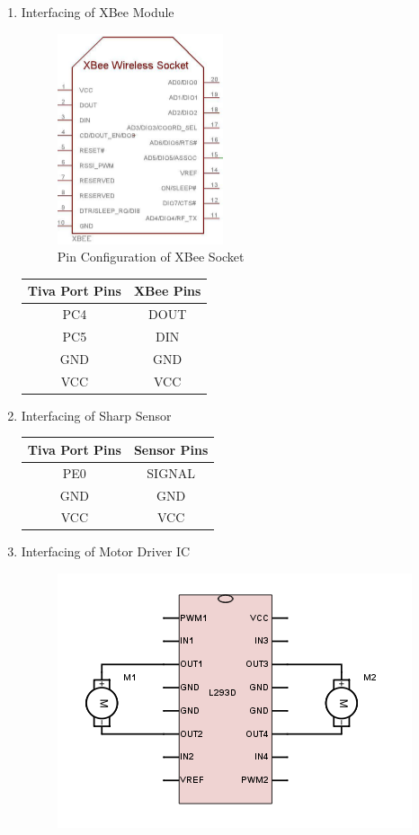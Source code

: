 \documentclass[a4paper,12pt,oneside]{book}
\begin{document}
\begin {enumerate}
\item Interfacing of XBee Module\\
\begin{figure}[h]
	\centering
	\includegraphics[scale=1]{XBee}
	\caption{Pin Configuration of XBee Socket}
\end{figure}
\begin{center}
	\begin{tabular}{| c | c |}
		\hline
		\textbf{Tiva Port Pins} & \textbf{XBee Pins}\\
		\hline
		PC4 & DOUT\\
		\hline
		PC5 & DIN\\
		\hline
		GND & GND\\
		\hline
		VCC & VCC \\
		\hline
	\end{tabular}
\end{center}
\newpage
\item Interfacing of Sharp Sensor\\
\begin{center}
	\begin{tabular}{| c | c |}
		\hline
		\textbf{Tiva Port Pins} & \textbf{Sensor Pins}\\
		\hline
		PE0 & SIGNAL\\
		\hline
		GND & GND\\
		\hline
		VCC & VCC \\
		\hline
	\end{tabular}
\end{center}
\item Interfacing of Motor Driver IC\\
\begin{figure}[h]
	\centering
	\includegraphics[scale=1]{MOTOR_DRIVER}

\end{figure}
\end{enumerate}
\end{document}
